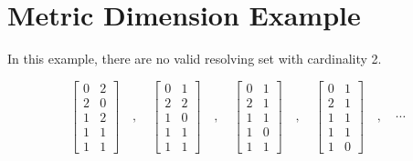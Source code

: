 \documentclass[12pt]{article}
\begin{document}
\section*{Metric Dimension Example}
\begin{minipage}[t]{0.65\textwidth}
\setlength{\parskip}{\baselineskip}

In this example, there are no valid resolving set with cardinality 2.

\[
\left[ \begin{array}{ll}
	0 & 2 \\
	2 & 0 \\
	1 & 2 \\
	1 & 1 \\
	1 & 1
\end{array} \right]
\quad,\quad
\left[ \begin{array}{ll}
	0 & 1 \\
	2 & 2 \\
	1 & 0 \\
	1 & 1 \\
	1 & 1
\end{array} \right]
\quad,\quad
\left[ \begin{array}{ll}
	0 & 1 \\
	2 & 1 \\
	1 & 1 \\
	1 & 0 \\
	1 & 1
\end{array} \right]
\quad,\quad
\left[ \begin{array}{ll}
	0 & 1 \\
	2 & 1 \\
	1 & 1 \\
	1 & 1 \\
	1 & 0
\end{array} \right]
\quad,\quad
\cdots
\]

\end{minipage}
\hfill
\begin{minipage}[t]{0.3\textwidth}
	\begin{figure}[H]
		
	\end{figure}
\end{minipage}

\newpage
\end{document}
